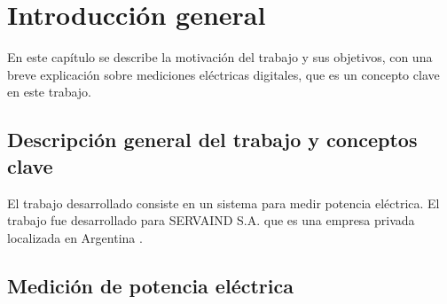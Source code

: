 
\chapter{Introducción general} %
En este capítulo se describe la motivación del trabajo y sus objetivos, con una breve explicación sobre mediciones eléctricas digitales, que es un concepto clave en este trabajo.


\label{Chapter1} %


\newcommand{\keyword}[1]{\textbf{#1}}
\newcommand{\tabhead}[1]{\textbf{#1}}
\newcommand{\code}[1]{\texttt{#1}}
\newcommand{\file}[1]{\texttt{\bfseries#1}}
\newcommand{\option}[1]{\texttt{\itshape#1}}
\newcommand{\grados}{$^{\circ}$}



\section{Descripción general del trabajo y conceptos clave}

El trabajo desarrollado consiste en un sistema para medir potencia eléctrica. El trabajo fue desarrollado para SERVAIND S.A. que es una empresa privada localizada en Argentina  \citep{Servaind}.



\section{Medición de potencia eléctrica}



